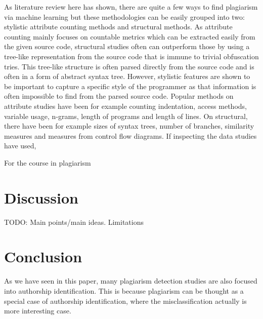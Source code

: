 \documentclass[english]{tktltiki2}
\theoremstyle{definition}
\theoremstyle{remark}
\begin{document}
As literature review here has shown, there are quite a few ways to find plagiarism via machine learning but these methodologies can be easily grouped into two: stylistic attribute counting methods and structural methods. As attribute counting mainly focuses on countable metrics which can be extracted easily from the given source code, structural studies often can outperform those by using a tree-like representation from the source code that is immune to trivial obfuscation tries. This tree-like structure is often parsed directly from the source code and is often in a form of abstract syntax tree. However, stylistic features are shown to be important to capture a specific style of the programmer as that information is often impossible to find from the parsed source code. Popular methods on attribute studies have been for example counting indentation, access methods, variable usage, n-grams, length of programs and length of lines. On structural, there have been for example sizes of syntax trees, number of branches, similarity measures and measures from control flow diagrams. If inspecting the data studies have used, 

For the course in plagiarism 


\section{Discussion}

TODO: Main points/main ideas. Limitations

\section{Conclusion}

As we have seen in this paper, many plagiarism detection studies are also focused into authorship identification. This is because plagiarism can be thought as a special case of authorship identification, where the misclassification actually is more interesting case. 


%
%
%
%







% 
\end{document}
